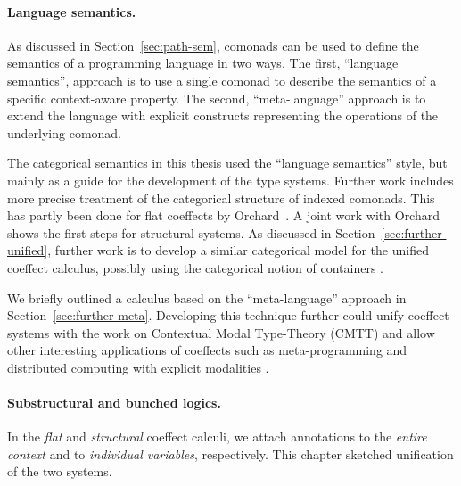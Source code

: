 
\paragraph{Language semantics.}

As discussed in Section~\ref{sec:path-sem}, comonads can be used to define the semantics of a
programming language in two ways. The first, ``language semantics'', approach is to use a
single comonad to describe the semantics of a specific context-aware property. The second,
``meta-language'' approach is to extend the language with explicit constructs representing the
operations of the underlying comonad.

The categorical semantics in this thesis used the ``language semantics'' style, but mainly as a
guide for the development of the type systems. Further work includes more precise treatment of
the categorical structure of indexed comonads. This has partly been done for flat coeffects by
Orchard~\cite{comonads-dom-thesis}. A joint work with Orchard~\cite{coeffects-icfp14} shows the
first steps for structural systems. As discussed in Section~\ref{sec:further-unified}, further
work is to develop a similar categorical model for the unified coeffect calculus, possibly using
the categorical notion of containers \cite{types-containers}.

We briefly outlined a calculus based on the ``meta-language'' approach in Section~\ref{sec:further-meta}.
Developing this technique further could unify coeffect systems with the work on Contextual Modal
Type-Theory (CMTT) \cite{logic-cmtt} and allow other interesting applications of coeffects such
as meta-programming \cite{logic-cmtt} and distributed computing with explicit modalities \cite{app-distributed-ml5}.


\paragraph{Substructural and bunched logics.}

In the \emph{flat} and \emph{structural} coeffect calculi, we attach annotations to the \emph{entire
context} and to \emph{individual variables}, respectively. This chapter sketched unification of
the two systems.

